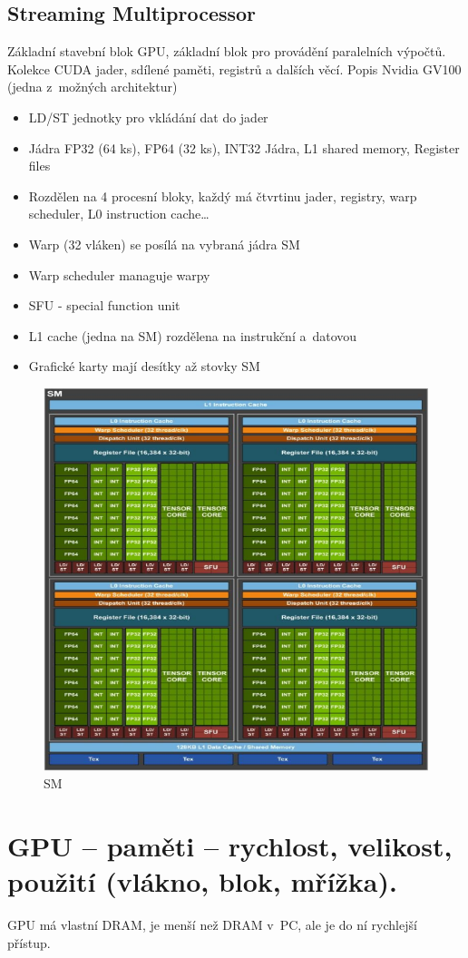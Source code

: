\subsection{Streaming Multiprocessor}
Základní stavební blok GPU, základní blok pro provádění paralelních výpočtů.
Kolekce CUDA jader, sdílené paměti, registrů a dalších věcí. 
Popis Nvidia GV100 (jedna z~možných architektur)
\begin{itemize}
    \item LD/ST jednotky pro vkládání dat do jader
    \item Jádra FP32 (64 ks), FP64 (32 ks), INT32 Jádra, L1 shared memory, Register files
    \item Rozdělen na 4 procesní bloky, každý má čtvrtinu jader, registry, warp scheduler, L0 instruction cache\dots
    \item Warp (32 vláken) se posílá na vybraná jádra SM
    \item Warp scheduler managuje warpy
    \item SFU - special function unit
    \item L1 cache (jedna na SM) rozdělena na instrukční a~datovou
    \item Grafické karty mají desítky až stovky SM
\end{itemize}

\begin{figure}[ht]
    \centering
    \includegraphics[width=0.7\linewidth]{pict/SM.png}
    \caption{SM}
    \label{fig:SM}
\end{figure}

\section{GPU – paměti – rychlost, velikost, použití (vlákno, blok, mřížka).}
GPU má vlastní DRAM, je menší než DRAM v~PC, ale je do ní rychlejší přístup.

